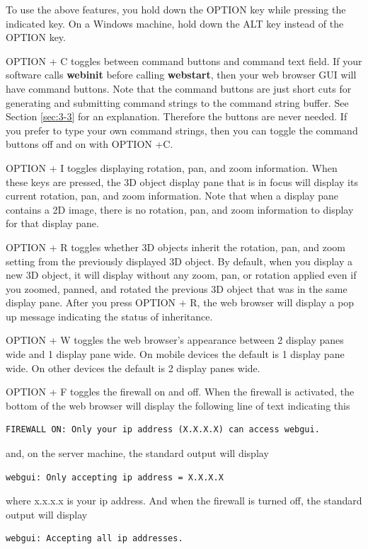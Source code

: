 To use the above features, you hold down the OPTION key while pressing the indicated key. On a Windows machine,
hold down the ALT key instead of the OPTION key.

OPTION + C toggles between command buttons and command text field. If your software calls \textbf{webinit} before
calling \textbf{webstart}, then your web browser GUI will have command buttons. Note that the command buttons are just
short cuts for generating and submitting command strings to the command string buffer. See Section \ref{sec:3-3} for an 
explanation. Therefore the buttons are never needed. If you prefer to type your own command strings, then you can
toggle the command buttons off and on with OPTION +C.

OPTION + I toggles displaying rotation, pan, and zoom information. When these keys are pressed, the 3D object display
pane that is in focus will display its current rotation, pan, and zoom information. Note that when a display pane contains
a 2D image, there is no rotation, pan, and zoom information to display for that display pane.

OPTION + R toggles whether 3D objects inherit the rotation, pan, and zoom setting from the previously displayed 3D object.
By default, when you display a new 3D object, it will display without any zoom, pan, or rotation applied even if you zoomed, 
panned, and rotated the previous 3D object that was in the same display pane. After you press OPTION + R, the web
browser will display a pop up message indicating the status of inheritance.

OPTION + W toggles the web browser's appearance between 2 display panes wide and 1 display pane wide. On mobile
devices the default is 1 display pane wide. On other devices the default is 2 display panes wide.

OPTION + F toggles the firewall on and off. When the firewall is activated, the bottom of the web browser will display the 
following line of text indicating this
\begin{verbatim}
FIREWALL ON: Only your ip address (X.X.X.X) can access webgui.
\end{verbatim}
and, on the server machine, the standard output will display
\begin{verbatim}
webgui: Only accepting ip address = X.X.X.X
\end{verbatim}
where x.x.x.x is your ip address. And when the firewall is turned off, the standard output will display
\begin{verbatim}
webgui: Accepting all ip addresses.
\end{verbatim}

